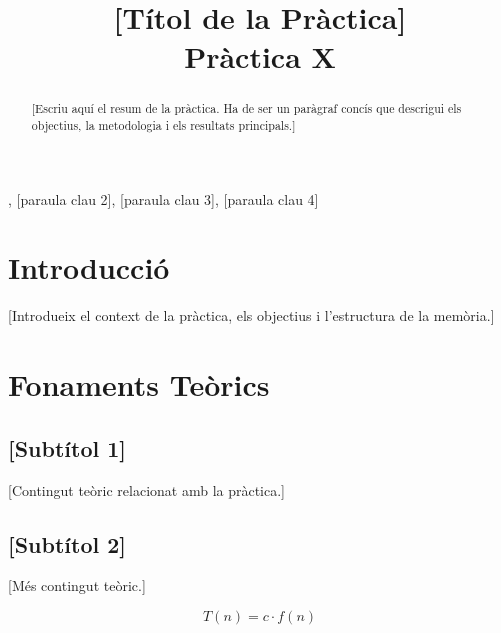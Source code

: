 \documentclass[conference,compsoc]{IEEEtran}
\begin{document}
\title{[Títol de la Pràctica] \\ Pràctica X}

\author{
}

\maketitle

\begin{strip}
\begin{abstract}
[Escriu aquí el resum de la pràctica. Ha de ser un paràgraf concís que
descrigui els objectius, la metodologia i els resultats principals.]
\end{abstract}

\begin{IEEEkeywords}
, [paraula clau 2], [paraula clau 3], [paraula clau 4]
\end{IEEEkeywords}
\end{strip}

\IEEEpeerreviewmaketitle

\section{Introducció}
[Introdueix el context de la pràctica, els objectius i l'estructura
de la memòria.]

\section{Fonaments Teòrics}

\subsection{[Subtítol 1]}
[Contingut teòric relacionat amb la pràctica.]

\subsection{[Subtítol 2]}
[Més contingut teòric.]

\begin{equation}
\label{eq:example}
T(n) = c \cdot f(n)
\end{equation}
\end{document}
